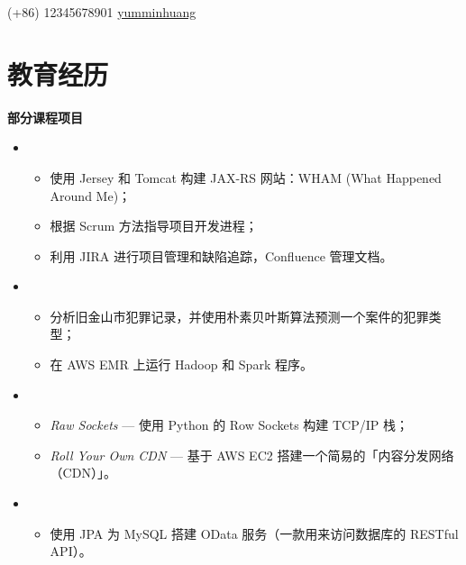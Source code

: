 \documentclass{resume}
\begin{document}


{(+86) 12345678901}
{\href{https://github.com/yumminhuang}{yumminhuang}}


\section{教育经历}
\textbf{部分课程项目}
\begin{itemize}
\item {}
\begin{itemize}
\item 使用 Jersey 和 Tomcat 构建 JAX-RS 网站：WHAM (What Happened Around Me)；
\item 根据 Scrum 方法指导项目开发进程；
\item 利用 JIRA 进行项目管理和缺陷追踪，Confluence 管理文档。
\end{itemize}

\item {}
\begin{itemize}
\item 分析旧金山市犯罪记录，并使用朴素贝叶斯算法预测一个案件的犯罪类型；
\item 在 AWS EMR 上运行 Hadoop 和 Spark 程序。
\end{itemize}

\item {}
\begin{itemize}
\item \textit{Raw Sockets} --- 使用 Python 的 Row Sockets 构建 TCP/IP 栈；
\item \textit{Roll Your Own CDN} --- 基于 AWS EC2 搭建一个简易的「内容分发网络（CDN）」。
\end{itemize}

\item {}
\begin{itemize}
\item 使用 JPA 为 MySQL 搭建 OData 服务（一款用来访问数据库的 RESTful API）。
\end{itemize}
\end{itemize}
\end{document}
